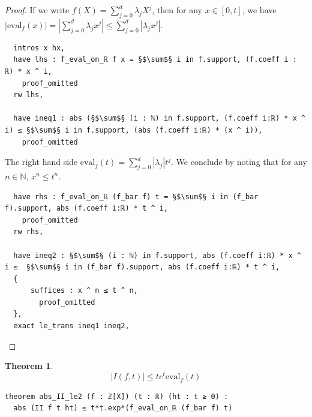 \documentclass{report}
\theoremstyle{definition}
\newtheorem{theorem}{Theorem}[section]
\begin{document}
\begin{proof}
If we write $f(X)=\sum_{j=0}^d\lambda_j X^j$, then for any $x\in[0,t]$, we have $\left|\mathrm{eval}_f(x)\right|=\left|\sum_{j=0}^d\lambda_j x^j\right|\le \sum_{j=0}^d\left|\lambda_j x^j\right|$.
\begin{verbatim}
  intros x hx,
  have lhs : f_eval_on_ℝ f x = §$\sum$§ i in f.support, (f.coeff i : ℝ) * x ^ i,
    proof_omitted
  rw lhs,
  
  have ineq1 : abs (§$\sum$§ (i : ℕ) in f.support, (f.coeff i:ℝ) * x ^ i) ≤ §$\sum$§ i in f.support, (abs (f.coeff i:ℝ) * (x ^ i)),
    proof_omitted
\end{verbatim}

The right hand side $\mathrm{eval}_{\bar f}(t)=\sum_{j=0}^d \left|\lambda_j\right|t^j$. We conclude by noting that for any $n\in\mathbb N$, $x^n\le t^n$.

\begin{verbatim}
  have rhs : f_eval_on_ℝ (f_bar f) t = §$\sum$§ i in (f_bar f).support, abs (f.coeff i:ℝ) * t ^ i,
    proof_omitted
  rw rhs,

  have ineq2 : §$\sum$§ (i : ℕ) in f.support, abs (f.coeff i:ℝ) * x ^ i ≤  §$\sum$§ i in (f_bar f).support, abs (f.coeff i:ℝ) * t ^ i,
  {
      suffices : x ^ n ≤ t ^ n,
        proof_omitted
  },
  exact le_trans ineq1 ineq2,  
\end{verbatim}
\end{proof}

\begin{theorem}\label{lemma:Iupperbound}
$$\left|I(f, t)\right|\le t e^t\mathrm{eval}_{\bar f}(t)$$
\begin{verbatim}
theorem abs_II_le2 (f : ℤ[X]) (t : ℝ) (ht : t ≥ 0) : 
  abs (II f t ht) ≤ t*t.exp*(f_eval_on_ℝ (f_bar f) t)
\end{verbatim}
\end{theorem}
\end{document}
